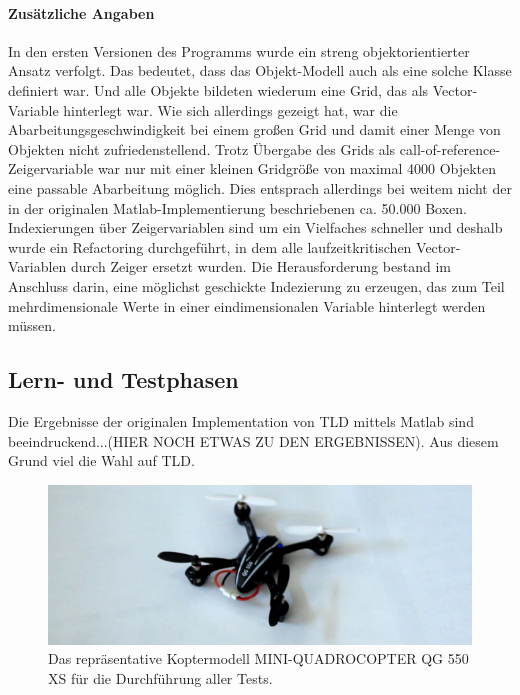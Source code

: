 \paragraph{Zusätzliche Angaben}
In den ersten Versionen des Programms wurde ein streng objektorientierter Ansatz verfolgt. Das bedeutet, dass das Objekt-Modell auch als eine solche Klasse definiert war. Und alle Objekte bildeten wiederum eine Grid, das als Vector-Variable hinterlegt war. Wie sich allerdings gezeigt hat, war die Abarbeitungsgeschwindigkeit bei einem großen Grid und damit einer Menge von Objekten nicht zufriedenstellend. Trotz Übergabe des Grids als call-of-reference-Zeigervariable war nur mit einer kleinen Gridgröße von maximal 4000 Objekten eine passable Abarbeitung möglich. Dies entsprach allerdings bei weitem nicht der in der originalen Matlab-Implementierung beschriebenen ca. 50.000 Boxen. Indexierungen über Zeigervariablen sind um ein Vielfaches schneller und deshalb wurde ein Refactoring durchgeführt, in dem alle laufzeitkritischen Vector-Variablen durch Zeiger ersetzt wurden. Die Herausforderung bestand im Anschluss darin, eine möglichst geschickte Indezierung zu erzeugen, das zum Teil mehrdimensionale Werte in einer eindimensionalen Variable hinterlegt werden müssen.

\subsection{Lern- und Testphasen}
\label{subsection:learning_and_testing}
Die Ergebnisse der originalen Implementation von TLD mittels Matlab sind beeindruckend...(HIER NOCH ETWAS ZU DEN ERGEBNISSEN). Aus diesem Grund viel die Wahl auf TLD.

\begin{figure}[H]
	\begin{centering}
		\includegraphics[scale=0.6]{../pictures/kopter}
		\caption{Das repräsentative Koptermodell MINI-QUADROCOPTER QG 550 XS für die Durchführung aller Tests.}
		\label{abb:kopter}
		\par
	\end{centering}
\end{figure}


